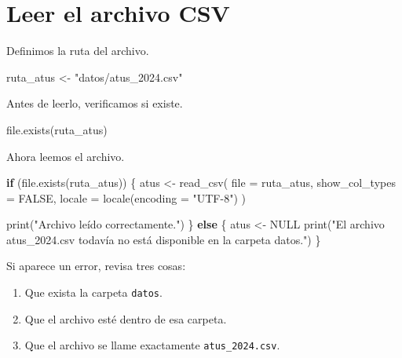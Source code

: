 \documentclass[
  11pt,
  letterpaper,
]{book}
\newenvironment{Shaded}{\begin{snugshade}}{\end{snugshade}}
\newcommand{\AttributeTok}[1]{\textcolor[rgb]{0.40,0.45,0.13}{#1}}
\newcommand{\ConstantTok}[1]{\textcolor[rgb]{0.56,0.35,0.01}{#1}}
\newcommand{\ControlFlowTok}[1]{\textcolor[rgb]{0.00,0.23,0.31}{\textbf{#1}}}
\newcommand{\FunctionTok}[1]{\textcolor[rgb]{0.28,0.35,0.67}{#1}}
\newcommand{\NormalTok}[1]{\textcolor[rgb]{0.00,0.23,0.31}{#1}}
\newcommand{\OtherTok}[1]{\textcolor[rgb]{0.00,0.23,0.31}{#1}}
\newcommand{\StringTok}[1]{\textcolor[rgb]{0.13,0.47,0.30}{#1}}
\providecommand{\tightlist}{%
  \setlength{\itemsep}{0pt}\setlength{\parskip}{0pt}}
\begin{document}
\section{Leer el archivo CSV}\label{leer-el-archivo-csv}

Definimos la ruta del archivo.

\begin{Shaded}
\begin{Highlighting}[]
\NormalTok{ruta\_atus }\OtherTok{\textless{}{-}} \StringTok{"datos/atus\_2024.csv"}
\end{Highlighting}
\end{Shaded}

Antes de leerlo, verificamos si existe.

\begin{Shaded}
\begin{Highlighting}[]
\FunctionTok{file.exists}\NormalTok{(ruta\_atus)}
\end{Highlighting}
\end{Shaded}

Ahora leemos el archivo.

\begin{Shaded}
\begin{Highlighting}[]
\ControlFlowTok{if}\NormalTok{ (}\FunctionTok{file.exists}\NormalTok{(ruta\_atus)) \{}
\NormalTok{  atus }\OtherTok{\textless{}{-}} \FunctionTok{read\_csv}\NormalTok{(}
    \AttributeTok{file =}\NormalTok{ ruta\_atus,}
    \AttributeTok{show\_col\_types =} \ConstantTok{FALSE}\NormalTok{,}
    \AttributeTok{locale =} \FunctionTok{locale}\NormalTok{(}\AttributeTok{encoding =} \StringTok{"UTF{-}8"}\NormalTok{)}
\NormalTok{  )}

  \FunctionTok{print}\NormalTok{(}\StringTok{"Archivo leído correctamente."}\NormalTok{)}
\NormalTok{\} }\ControlFlowTok{else}\NormalTok{ \{}
\NormalTok{  atus }\OtherTok{\textless{}{-}} \ConstantTok{NULL}
  \FunctionTok{print}\NormalTok{(}\StringTok{"El archivo atus\_2024.csv todavía no está disponible en la carpeta datos."}\NormalTok{)}
\NormalTok{\}}
\end{Highlighting}
\end{Shaded}

Si aparece un error, revisa tres cosas:

\begin{enumerate}
\def\labelenumi{\arabic{enumi}.}
\tightlist
\item
  Que exista la carpeta \texttt{datos}.
\item
  Que el archivo esté dentro de esa carpeta.
\item
  Que el archivo se llame exactamente \texttt{atus\_2024.csv}.
\end{enumerate}
\end{document}
